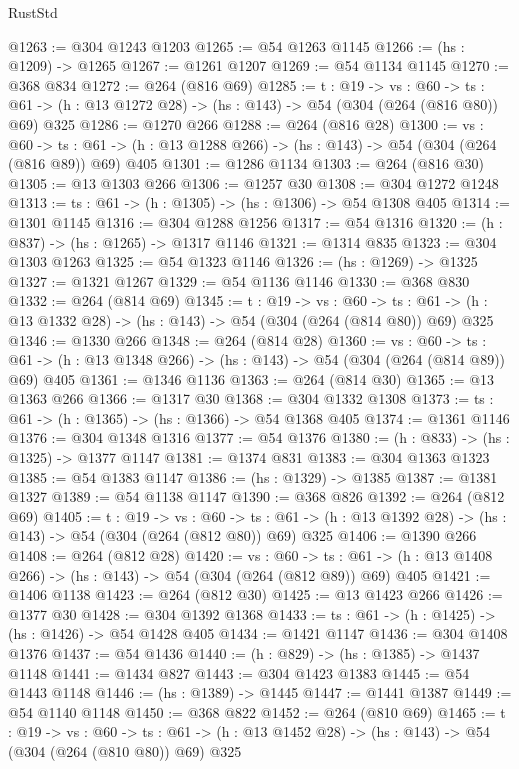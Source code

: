 \begin{lexlean}{RustStd}
\begin{coremodule}
@1263 := @304 @1243 @1203
@1265 := @54 @1263 @1145
@1266 := (hs : @1209) -> @1265
@1267 := @1261 @1207
@1269 := @54 @1134 @1145
@1270 := @368 @834
@1272 := @264 (@816 @69)
@1285 := {t : @19} ->
  {vs : @60} ->
  {ts : @61} -> (h : @13 @1272 @28) -> (hs : @143) -> @54 (@304 (@264 (@816 @80)) @69) @325
@1286 := @1270 @266
@1288 := @264 (@816 @28)
@1300 := {vs : @60} ->
  {ts : @61} -> (h : @13 @1288 @266) -> (hs : @143) -> @54 (@304 (@264 (@816 @89)) @69) @405
@1301 := @1286 @1134
@1303 := @264 (@816 @30)
@1305 := @13 @1303 @266
@1306 := @1257 @30
@1308 := @304 @1272 @1248
@1313 := {ts : @61} -> (h : @1305) -> (hs : @1306) -> @54 @1308 @405
@1314 := @1301 @1145
@1316 := @304 @1288 @1256
@1317 := @54 @1316
@1320 := (h : @837) -> (hs : @1265) -> @1317 @1146
@1321 := @1314 @835
@1323 := @304 @1303 @1263
@1325 := @54 @1323 @1146
@1326 := (hs : @1269) -> @1325
@1327 := @1321 @1267
@1329 := @54 @1136 @1146
@1330 := @368 @830
@1332 := @264 (@814 @69)
@1345 := {t : @19} ->
  {vs : @60} ->
  {ts : @61} -> (h : @13 @1332 @28) -> (hs : @143) -> @54 (@304 (@264 (@814 @80)) @69) @325
@1346 := @1330 @266
@1348 := @264 (@814 @28)
@1360 := {vs : @60} ->
  {ts : @61} -> (h : @13 @1348 @266) -> (hs : @143) -> @54 (@304 (@264 (@814 @89)) @69) @405
@1361 := @1346 @1136
@1363 := @264 (@814 @30)
@1365 := @13 @1363 @266
@1366 := @1317 @30
@1368 := @304 @1332 @1308
@1373 := {ts : @61} -> (h : @1365) -> (hs : @1366) -> @54 @1368 @405
@1374 := @1361 @1146
@1376 := @304 @1348 @1316
@1377 := @54 @1376
@1380 := (h : @833) -> (hs : @1325) -> @1377 @1147
@1381 := @1374 @831
@1383 := @304 @1363 @1323
@1385 := @54 @1383 @1147
@1386 := (hs : @1329) -> @1385
@1387 := @1381 @1327
@1389 := @54 @1138 @1147
@1390 := @368 @826
@1392 := @264 (@812 @69)
@1405 := {t : @19} ->
  {vs : @60} ->
  {ts : @61} -> (h : @13 @1392 @28) -> (hs : @143) -> @54 (@304 (@264 (@812 @80)) @69) @325
@1406 := @1390 @266
@1408 := @264 (@812 @28)
@1420 := {vs : @60} ->
  {ts : @61} -> (h : @13 @1408 @266) -> (hs : @143) -> @54 (@304 (@264 (@812 @89)) @69) @405
@1421 := @1406 @1138
@1423 := @264 (@812 @30)
@1425 := @13 @1423 @266
@1426 := @1377 @30
@1428 := @304 @1392 @1368
@1433 := {ts : @61} -> (h : @1425) -> (hs : @1426) -> @54 @1428 @405
@1434 := @1421 @1147
@1436 := @304 @1408 @1376
@1437 := @54 @1436
@1440 := (h : @829) -> (hs : @1385) -> @1437 @1148
@1441 := @1434 @827
@1443 := @304 @1423 @1383
@1445 := @54 @1443 @1148
@1446 := (hs : @1389) -> @1445
@1447 := @1441 @1387
@1449 := @54 @1140 @1148
@1450 := @368 @822
@1452 := @264 (@810 @69)
@1465 := {t : @19} ->
  {vs : @60} ->
  {ts : @61} -> (h : @13 @1452 @28) -> (hs : @143) -> @54 (@304 (@264 (@810 @80)) @69) @325

\end{coremodule}
\end{lexlean}

